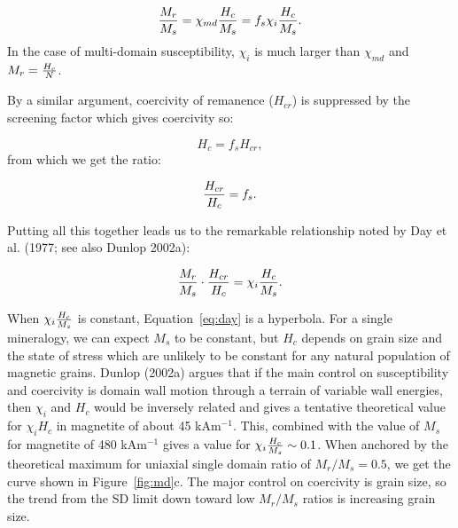 $$
{{M_r}\over{M_s}} = \chi_{md} { H_c\over{M_s}} = f_s \chi_i { H_c\over{M_s}}.
$$
\noindent In the case of multi-domain susceptibility,  $\chi_i$ is much larger than $\chi_{md}$ and $M_r = { {H_c}\over{N}}$.    

By a similar argument,
coercivity of remanence ($H_{cr}$) is suppressed by the  screening factor which gives coercivity so:

$$
H_c =  f_s H_{cr}, 
$$
\noindent    from which we get the ratio:

$$
{H_{cr}\over{H_c}} = f_s. 
$$
\noindent  

\noindent Putting all this together leads us to the remarkable relationship noted by 
Day et al. (1977; see also 
Dunlop 2002a): \nocite{day77,dunlop02a} 

\begin{equation}
{ M_r\over{M_s}} \cdot { H_{cr}\over{H_c}} = \chi_i { H_c\over {M_s}}.
\label{eq:day}
\end{equation} 

When  $\chi_i { H_c\over {M_s}}$ is constant, Equation~\ref{eq:day} is a hyperbola.   
For a single mineralogy, we can expect $M_s$ to be constant, but $H_c$ depends on grain size and the state of stress which are unlikely to be constant for any natural population of magnetic grains.   
Dunlop (2002a) \nocite{dunlop02a} argues that if the main control on susceptibility and coercivity is domain wall motion through a terrain of variable wall energies, then $\chi_i$ and $H_c$ would be inversely related and gives a tentative theoretical value for $\chi_iH_c$  in magnetite of  about 45 kAm$^{-1}$.   This, combined with the value of $M_s$ for magnetite of 480  kAm$^{-1}$  gives a value for $\chi_i { H_c\over {M_s}} \sim 0.1$.  
When anchored by the theoretical maximum for uniaxial single domain ratio of $M_r/M_s = 0.5$, we get the curve shown in Figure~\ref{fig:md}c.   The major control on coercivity is grain size, so the trend from the SD limit down toward low $M_r/M_s$ ratios is increasing grain size.  

   
  

